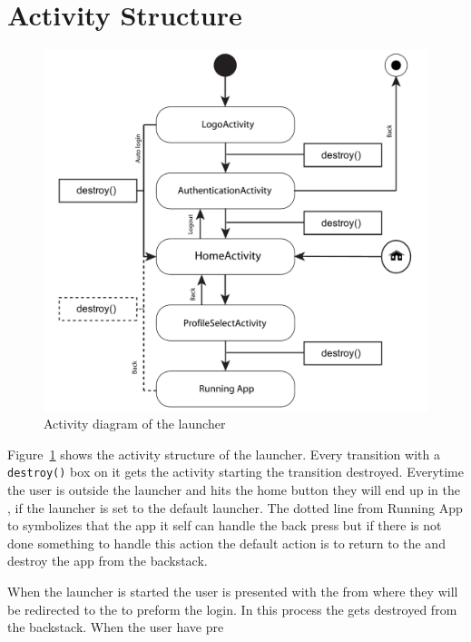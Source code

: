 \section{Activity Structure}

\begin{figure}[h!]
	\centering
	\includegraphics[width=1\textwidth]{gfx/activityDiagram.pdf}
	\caption{Activity diagram of the launcher}
	\label{fig:activity_diagram}
\end{figure}
Figure~\ref{fig:activity_diagram} shows the activity structure of the \giraf[] launcher. Every transition with a \verb+destroy()+ box on it gets the activity starting the transition destroyed. Everytime the user is outside the launcher and hits the home button they will end up in the , if the \giraf[] launcher is set to the default launcher.
The dotted line from Running App to  symbolizes that the app it self can handle the back press but if there is not done something to handle this action the default action is to return to the  and destroy the app from the backstack.

When the launcher is started the user is presented with the  from where they will be redirected to the  to preform the login. In this process the  gets destroyed from the backstack.
When the user have pre


